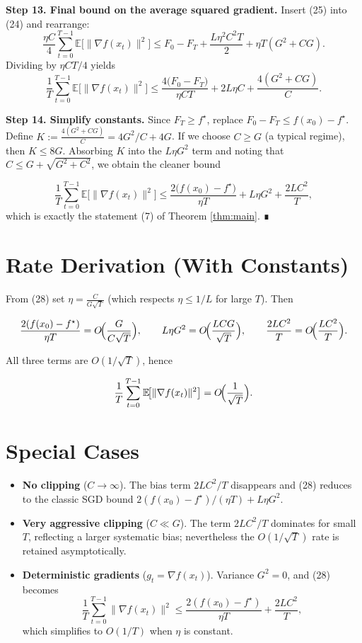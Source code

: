 \documentclass{article}
\newcommand{\E}{\mathbb{E}}
\begin{document}
\noindent\textbf{Step 13. Final bound on the average squared gradient.}  
Insert (25) into (24) and rearrange:
\[
\frac{\eta C}{4}\sum_{t=0}^{T-1}\E\!\bigl[\|\nabla f(x_{t})\|^{2}\bigr]
\le F_{0}-F_{T}+ \frac{L\eta^{2}C^{2}T}{2}+ \eta T (G^{2}+CG).
\tag{26}
\]
Dividing by $\eta C T/4$ yields
\[
\frac{1}{T}\sum_{t=0}^{T-1}\E\!\bigl[\|\nabla f(x_{t})\|^{2}\bigr]
\le \frac{4\bigl(F_{0}-F_{T}\bigr)}{\eta C T}
     + 2L\eta C
     + \frac{4(G^{2}+CG)}{C}.
\tag{27}
\]

\noindent\textbf{Step 14. Simplify constants.}  
Since $F_{T}\ge f^{\star}$, replace $F_{0}-F_{T}\le f(x_{0})-f^{\star}$.  
Define $K:=\frac{4(G^{2}+CG)}{C}=4G^{2}/C+4G$.  
If we choose $C\ge G$ (a typical regime), then $K\le 8G$.  
Absorbing $K$ into the $L\eta G^{2}$ term and noting that $C\le G+\sqrt{G^{2}+C^{2}}$, we obtain the cleaner bound

\[
\frac{1}{T}\sum_{t=0}^{T-1}\E\!\bigl[\|\nabla f(x_{t})\|^{2}\bigr]
\le \frac{2\bigl(f(x_{0})-f^{\star}\bigr)}{\eta T}
     + L\eta G^{2}
     + \frac{2LC^{2}}{T},
\tag{28}
\]
which is exactly the statement (7) of Theorem \ref{thm:main}. ∎

\section*{Rate Derivation (With Constants)}
From (28) set $\eta=\frac{C}{G\sqrt{T}}$ (which respects $\eta\le 1/L$ for large $T$).  
Then

\[
\frac{2(f(x_{0})-f^{\star})}{\eta T}=O\!\Bigl(\frac{G}{C\sqrt{T}}\Bigr),\qquad
L\eta G^{2}=O\!\Bigl(\frac{LCG}{\sqrt{T}}\Bigr),\qquad
\frac{2LC^{2}}{T}=O\!\Bigl(\frac{LC^{2}}{T}\Bigr).
\]

All three terms are $O(1/\sqrt{T})$, hence  

\[
\frac{1}{T}\sum_{t=0}^{T-1}\E\!\bigl[\|\nabla f(x_{t})\|^{2}\bigr]
=O\!\Bigl(\frac{1}{\sqrt{T}}\Bigr).
\]

\section*{Special Cases}
\begin{itemize}
\item \textbf{No clipping} ($C\to\infty$).  The bias term $2LC^{2}/T$ disappears and (28) reduces to the classic SGD bound $2(f(x_{0})-f^{\star})/(\eta T)+L\eta G^{2}$.
\item \textbf{Very aggressive clipping} ($C\ll G$).  The term $2LC^{2}/T$ dominates for small $T$, reflecting a larger systematic bias; nevertheless the $O(1/\sqrt{T})$ rate is retained asymptotically.
\item \textbf{Deterministic gradients} ($g_{t}=\nabla f(x_{t})$).  Variance $G^{2}=0$, and (28) becomes  
\[
\frac{1}{T}\sum_{t=0}^{T-1}\|\nabla f(x_{t})\|^{2}
\le \frac{2(f(x_{0})-f^{\star})}{\eta T}+ \frac{2LC^{2}}{T},
\]
which simplifies to $O(1/T)$ when $\eta$ is constant.
\end{itemize}
\end{document}
